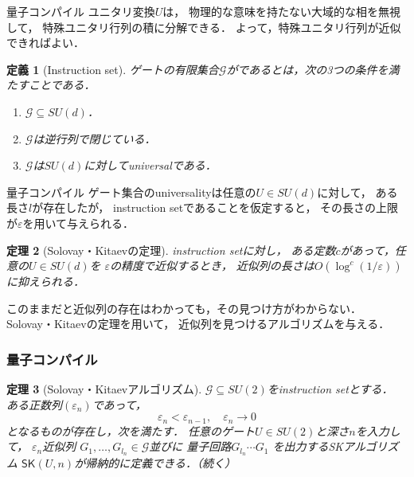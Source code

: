 \documentclass{beamer} %
\renewcommand{\epsilon}{\varepsilon}
\renewcommand{\subset}{\subseteq}
\newtheorem{thm}{定理}
\newtheorem{dfn}[thm]{定義}
\newcommand{\0}{\mathbf{0}}
\newcommand{\1}{\mathbf{1}}
\newcommand{\2}{\mathbf{2}}
\newcommand{\SK}{\mathsf{SK}}
\begin{document}
\begin{frame}{量子コンパイル}
  ユニタリ変換\(U\)は，
  物理的な意味を持たない大域的な相を無視して，
  特殊ユニタリ行列の積に分解できる．
  よって，特殊ユニタリ行列が近似できればよい．
  \begin{dfn}[Instruction set]
    ゲートの有限集合\(\mathcal{G}\)がであるとは，次の3つの条件を満たすことである．
    \begin{enumerate}
      \item \(\mathcal{G} \subset SU(d)\)．
      \item \(\mathcal{G}\)は逆行列で閉じている．
      \item \(\mathcal{G}\)は\(SU(d)\)に対してuniversalである．
    \end{enumerate}
  \end{dfn}
\end{frame}

\begin{frame}{量子コンパイル}
  ゲート集合のuniversalityは任意の\(U\in SU(d)\)に対して，
  ある長さ\(l\)が存在したが，
  instruction setであることを仮定すると，
  その長さの上限が\(\epsilon\)を用いて与えられる．
  \begin{thm}[Solovay・Kitaevの定理]
    instruction setに対し，
    ある定数\(c\)があって，任意の\(U\in SU(d)\)を
    \(\epsilon\)の精度で近似するとき，
    近似列の長さは\(O(\log^c(1/\epsilon))\)
    に抑えられる．
  \end{thm}
  このままだと近似列の存在はわかっても，その見つけ方がわからない．
  Solovay・Kitaevの定理を用いて，
  近似列を見つけるアルゴリズムを与える．
\end{frame}

\begin{frame}
  \frametitle{量子コンパイル}
  \begin{thm}[Solovay・Kitaevアルゴリズム]
    \label{SK algrithm}
    \(\mathcal{G}\subset SU(2)\)をinstruction setとする．
    ある正数列\((\epsilon_n)\)であって，
    \[
      \epsilon_n < \epsilon_{n-1},\quad \epsilon_n\to 0
    \]
    となるものが存在し，次を満たす．
    任意のゲート\(U\in SU(2)\)と深さ\(n\)を入力して，
    \(\epsilon_n\)近似列
    \(G_1,\ldots,G_{l_n}\in \mathcal{G}\)並びに
    量子回路\(G_{l_n}\cdots G_1\)
    を出力するSKアルゴリズム
    \(\SK(U,n)\)が帰納的に定義できる．（続く）
  \end{thm}
\end{frame}
\end{document}
